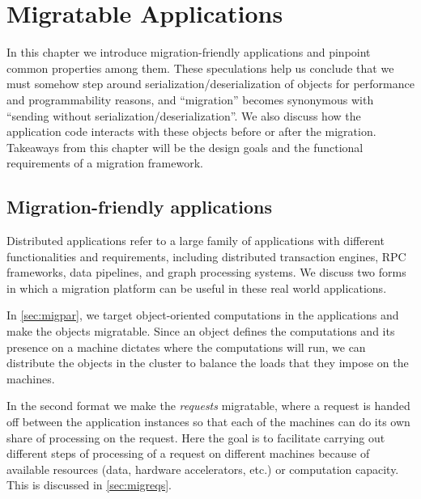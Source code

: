 \chapter{Migratable Applications}
\label{chap:migratableapps}

In this chapter we introduce migration-friendly applications and pinpoint
common properties among them. These speculations help us conclude that
we must somehow step around serialization/deserialization of objects for
performance and programmability reasons, and ``migration'' becomes
synonymous with ``sending without serialization/deserialization''.
We also discuss how the
application code interacts with these objects before or after the migration.
Takeaways from this chapter will be the design goals and the functional
requirements of a migration framework.
%
%
%
%


\section{Migration-friendly applications}
Distributed applications refer to a large family of applications with
different functionalities and requirements, including distributed transaction
engines, RPC frameworks, data pipelines, and graph processing systems.
We discuss two forms in which a migration platform can be useful in these
real world applications.

In \autoref{sec:migpar}, we target object-oriented computations in the applications
and make the objects migratable. Since an object defines the computations
and its presence on a machine dictates where the computations will run,
we can distribute the objects in the cluster to balance the loads that they
impose on the machines.

In the second format we make the
\emph{requests} migratable, where a request is handed off between the
application instances so that each of the machines can do its own
share of processing on the request. Here the goal is to facilitate carrying out
different steps of processing of a request on different machines because of
available resources (data, hardware accelerators, etc.) or computation capacity.
This is discussed in \ref{sec:migreqs}.

